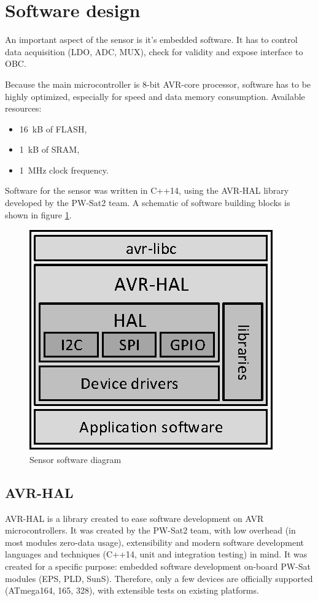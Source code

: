 \section{Software design}
    An important aspect of the sensor is it's embedded software. It has to control data acquisition (LDO, ADC, MUX), check for validity and expose \iic interface to OBC.

    Because the main microcontroller is 8-bit AVR-core processor, software has to be highly optimized, especially for speed and data memory consumption. Available resources:
    \begin{itemize}
        \item \SI{16}{\kilo B} of FLASH,
        \item \SI{1}{\kilo B} of SRAM,
        \item \SI{1}{\mega\hertz} clock frequency.
    \end{itemize}

    Software for the sensor was written in C++14, using the AVR-HAL library developed by the PW-Sat2 team. A schematic of software building blocks is shown in figure \ref{Sensor_software_diagram}.

    \begin{figure}[H]
        \centering
        \includegraphics[width=0.5\paperwidth]{img/06/software_diagram.eps}
        \caption{Sensor software diagram}
        \label{Sensor_software_diagram}
    \end{figure}

    \subsection{AVR-HAL}
    AVR-HAL is a library created to ease software development on AVR microcontrollers. It was created by the PW-Sat2 team, with low overhead (in most modules zero-data usage), extensibility and modern software development languages and techniques (C++14, unit and integration testing) in mind. It was created for a specific purpose: embedded software development on-board PW-Sat modules (EPS, PLD, SunS). Therefore, only a few devices are officially supported (ATmega164, 165, 328), with extensible tests on existing platforms.

